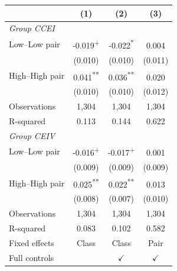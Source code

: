 \begin{tabular}{lccc}\toprule
& (1) & (2) & (3)\\\midrule
\multicolumn{4}{l}{\textit{Group CCEI}}\\[3pt]
Low--Low pair & -0.019\textsuperscript{+} & -0.022\textsuperscript{*} & 0.004\textsuperscript{}\\
 & (0.010) & (0.010) & (0.011)\\
High--High pair & 0.041\textsuperscript{**} & 0.036\textsuperscript{**} & 0.020\textsuperscript{}\\
 & (0.010) & (0.010) & (0.012)\\
Observations & 1,304 & 1,304 & 1,304\\
R-squared & 0.113 & 0.144 & 0.622\\\midrule
\multicolumn{4}{l}{\textit{Group CEIV}}\\[3pt]
Low--Low pair & -0.016\textsuperscript{+} & -0.017\textsuperscript{+} & 0.001\textsuperscript{}\\
 & (0.009) & (0.009) & (0.009)\\
High--High pair & 0.025\textsuperscript{**} & 0.022\textsuperscript{**} & 0.013\textsuperscript{}\\
 & (0.008) & (0.007) & (0.010)\\
Observations & 1,304 & 1,304 & 1,304\\
R-squared & 0.083 & 0.102 & 0.582\\\midrule
Fixed effects & Class & Class & Pair\\
Full controls & & $\checkmark$ & $\checkmark$\\
\bottomrule\end{tabular}
